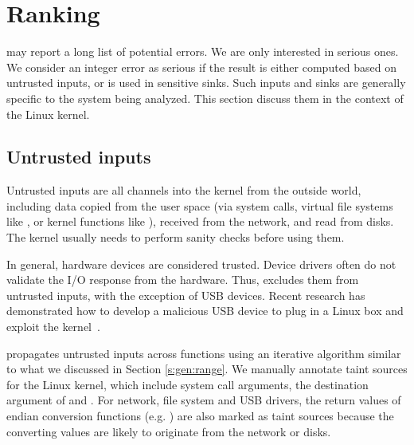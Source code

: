 \section{Ranking}
\label{s:rank}

\sys may report a long list of potential errors.  We are only interested
in serious ones.  We consider an integer error as serious if the
result is either computed based on untrusted inputs, or is used in
sensitive sinks.  Such inputs and sinks are generally specific to
the system being analyzed.  This section discuss them in the context
of the Linux kernel.

\subsection{Untrusted inputs}

Untrusted inputs are all channels into the kernel from the outside world,
including data copied from the user space (via system calls, virtual file
systems like , or kernel functions like ),
received from the network, and read from disks. The kernel usually needs to
perform sanity checks before using them. 

In general, hardware devices are considered trusted. Device drivers often do
not validate the I/O response from the hardware. Thus, \sys excludes them from
untrusted inputs, with the exception of USB devices.  Recent research has
demonstrated how to develop a malicious USB device to plug in a Linux box and
exploit the kernel~\cite{usb:buffer-overflow}.

\sys propagates untrusted inputs across functions using an iterative algorithm
similar to what we discussed in Section \ref{s:gen:range}. We manually annotate
taint sources for the Linux kernel, which include system call arguments, the
destination argument of  and . For network,
file system and USB drivers, the return values of endian conversion functions
(e.g. ) are also marked as taint sources because the
converting values are likely to originate from the network or disks.




